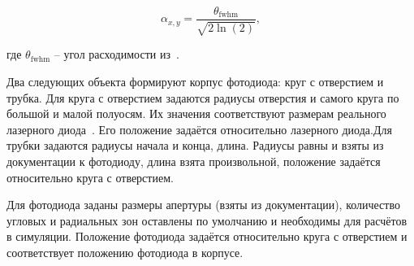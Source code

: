 \begin{equation*}
    \alpha_{x, y}=\frac{\theta_{\mathrm{fwhm}}}{\sqrt{2 \ln (2)}},
\end{equation*}

где $\theta_{\mathrm{fwhm}}$ \--- угол расходимости из~\cite{LDThorlabs}.

Два следующих объекта формируют корпус фотодиода: круг с отверстием и трубка. Для круга с отверстием задаются радиусы отверстия и самого круга по большой и малой полуосям. Их значения соответствуют размерам реального лазерного диода~\cite{PDThorlabs}. Его положение задаётся относительно лазерного диода.Для трубки задаются радиусы начала и конца, длина. Радиусы равны и взяты из документации к фотодиоду, длина взята произвольной, положение задаётся относительно круга с отверстием.

Для фотодиода заданы размеры апертуры (взяты из документации), количество угловых и радиальных зон оставлены по умолчанию и необходимы для расчётов в симуляции. Положение фотодиода задаётся относительно круга с отверстием и соответствует положению фотодиода в корпусе.




